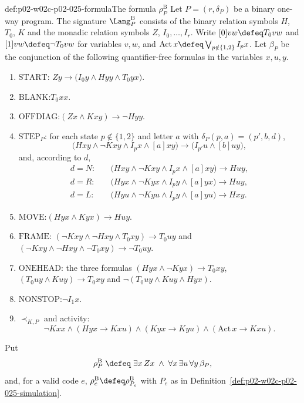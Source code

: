 \begin{hbdefinition}{def:p02-w02c-p02-025-formula}{The formula \(\rho^{\mathrm B}_{P}\)}
Let \(P=(r,\delta_P)\) be a binary one-way program.  The signature
\(\Lang^{\mathrm B}_P\) consists of the binary relation symbols \(H\), \(T_0\),
\(K\) and the monadic relation symbols \(Z\), \(I_0,\ldots,I_r\).  Write
\([0]vw\defeq T_0vw\) and \([1]vw\defeq\neg T_0vw\) for variables \(v,w\), and
\(\mathrm{Act}\,x\defeq\bigvee_{p\notin\{1,2\}}I_px\).  Let \(\beta_P\) be the
conjunction of the following quantifier-free formulas in the variables
\(x,u,y\).
\begin{enumerate}
\item[(\(\beta\)1)] \(\mathrm{START}\):\quad
  \(Zy\to\bigl(I_0y\land Hyy\land T_0yx\bigr)\).
\item[(\(\beta\)2)] \(\mathrm{BLANK}\):\quad \(T_0xx\).
\item[(\(\beta\)3)] \(\mathrm{OFFDIAG}\):\quad \((Zx\land Kxy)\to\neg Hyy\).
\item[(\(\beta\)4)] \(\mathrm{STEP}_P\): for each state \(p\notin\{1,2\}\) and
  letter \(a\) with \(\delta_P(p,a)=(p',b,d)\),
  \[
   \bigl(Hxy\land\neg Kxy\land I_px\land[a]xy\bigr)\to
   \bigl(I_{p'}u\land[b]uy\bigr),
  \]
  and, according to \(d\),
  \[
  \begin{aligned}
   d=N:&\quad\bigl(Hxy\land\neg Kxy\land I_px\land[a]xy\bigr)\to Huy,\\
   d=R:&\quad\bigl(Hyx\land\neg Kyx\land I_py\land[a]yx\bigr)\to Huy,\\
   d=L:&\quad\bigl(Hyu\land\neg Kyu\land I_py\land[a]yu\bigr)\to Hxy.
  \end{aligned}
  \]
\item[(\(\beta\)5)] \(\mathrm{MOVE}\):\quad \((Hyx\land Kyx)\to Huy\).
\item[(\(\beta\)6)] \(\mathrm{FRAME}\):\quad
  \((\neg Kxy\land\neg Hxy\land T_0xy)\to T_0uy\) and
  \((\neg Kxy\land\neg Hxy\land\neg T_0xy)\to\neg T_0uy\).
\item[(\(\beta\)7)] \(\mathrm{ONEHEAD}\): the three formulas
  \((Hyx\land\neg Kyx)\to T_0xy\), \((T_0uy\land Kuy)\to T_0xy\) and
  \(\neg(T_0uy\land Kuy\land Hyx)\).
\item[(\(\beta\)8)] \(\mathrm{NONSTOP}\):\quad \(\neg I_1x\).
\item[(\(\beta\)9)] \(\prec_{K,P}\) and activity:
  \[
   \neg Kxx\land(Hyx\to Kxu)\land(Kyx\to Kyu)\land
   (\mathrm{Act}\,x\to Kxu).
  \]
\end{enumerate}
Put
\[
 \rho^{\mathrm B}_P\;\defeq\;\exists x\,Zx\;\land\;\forall x\,\exists u\,
 \forall y\,\beta_P ,
\]
and, for a valid code \(e\), \(\rho^{\mathrm B}_e\defeq\rho^{\mathrm B}_{P_e}\)
with \(P_e\) as in Definition~\ref{def:p02-w02c-p02-025-simulation}.
\end{hbdefinition}

